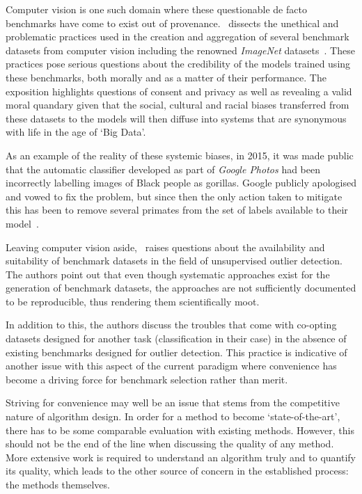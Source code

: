 Computer vision is one such domain where these questionable de facto benchmarks
have come to exist out of provenance.~\cite{Prabhu2020} dissects the unethical
and problematic practices used in the creation and aggregation of several
benchmark datasets from computer vision including the renowned \emph{ImageNet}
datasets~\cite{Deng2009}. These practices pose serious questions about the
credibility of the models trained using these benchmarks, both morally and as a
matter of their performance. The exposition highlights questions of consent and
privacy as well as revealing a valid moral quandary given that the social,
cultural and racial biases transferred from these datasets to the models will
then diffuse into systems that are synonymous with life in the age of `Big
Data'.

As an example of the reality of these systemic biases, in 2015, it was made
public that the automatic classifier developed as part of \emph{Google Photos}
had been incorrectly labelling images of Black people as gorillas. Google
publicly apologised and vowed to fix the problem, but since then the only action
taken to mitigate this has been to remove several primates from the set of
labels available to their model~\cite{Simonite2018}.

Leaving computer vision aside,~\cite{Campos2016} raises questions about the
availability and suitability of benchmark datasets in the field of unsupervised
outlier detection. The authors point out that even though systematic approaches
exist for the generation of benchmark datasets, the approaches are not
sufficiently documented to be reproducible, thus rendering them scientifically
moot.

In addition to this, the authors discuss the troubles that come with co-opting
datasets designed for another task (classification in their case) in the absence
of existing benchmarks designed for outlier detection. This practice is
indicative of another issue with this aspect of the current paradigm where
convenience has become a driving force for benchmark selection rather than
merit.

Striving for convenience may well be an issue that stems from the competitive
nature of algorithm design. In order for a method to become `state-of-the-art',
there has to be some comparable evaluation with existing methods. However, this
should not be the end of the line when discussing the quality of any method.
More extensive work is required to understand an algorithm truly and to quantify
its quality, which leads to the other source of concern in the established
process: the methods themselves.

